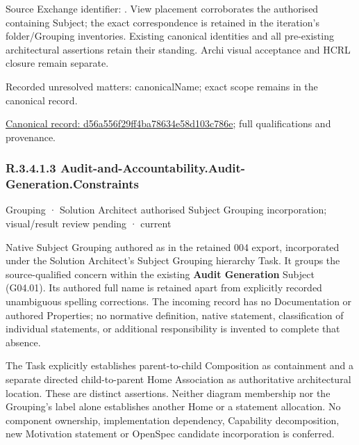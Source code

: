 Source Exchange identifier: \texttt{}. View placement corroborates
the authorised containing Subject; the exact correspondence is retained in the
iteration's folder/Grouping inventories. Existing canonical identities and all
pre-existing architectural assertions retain their standing. Archi visual
acceptance and HCRL closure remain separate.


{\small Recorded unresolved matters: canonicalName; exact scope remains in the canonical record.}\par
{\footnotesize \href{../../../../continuum/grouping/d56a556f29ff4ba78634e58d103c786e.md}{Canonical record: d56a556f29ff4ba78634e58d103c786e}; full qualifications and provenance.}\par
\subsubsection*{R.3.4.1.3 Audit-and-Accountability.Audit-Generation.Constraints}
\label{navigation:R.3.4.1.3}

\label{element:aeb3b98e54124d94b4a68ab18de60514}
{\small Grouping · Solution Architect authorised Subject Grouping incorporation; visual/result review pending · current}\par

Native Subject Grouping authored as \texttt{} in the retained 004 export,
incorporated under the Solution Architect's Subject Grouping hierarchy Task.
It groups the source-qualified \texttt{} concern within
the existing \textbf{Audit Generation} Subject (G04.01). Its authored full name
is retained apart from explicitly recorded unambiguous spelling corrections.
The incoming record has no Documentation or authored Properties; no normative
definition, native statement, classification of individual statements, or
additional responsibility is invented to complete that absence.



The Task explicitly establishes parent-to-child Composition as containment and
a separate directed child-to-parent Home Association as authoritative architectural
location. These are distinct assertions. Neither diagram membership nor the
Grouping's label alone establishes another Home or a statement allocation.
No component ownership, implementation dependency, Capability decomposition,
new Motivation statement or OpenSpec candidate incorporation is conferred.



